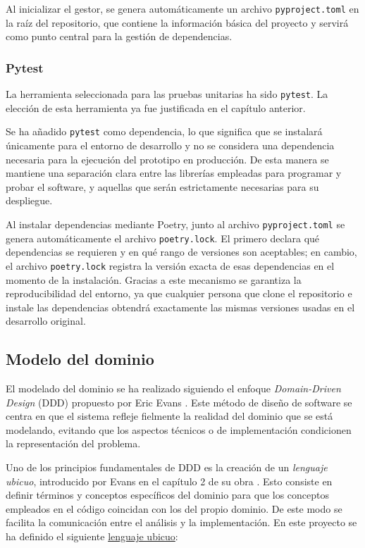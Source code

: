 Al inicializar el gestor, se genera automáticamente un archivo \texttt{pyproject.toml} en la raíz del
repositorio, que contiene la información básica del proyecto y servirá como punto central
para la gestión de dependencias.

\subsubsection{Pytest}
La herramienta seleccionada para las pruebas unitarias ha sido \texttt{pytest}.
La elección de esta herramienta ya fue justificada en el capítulo anterior.

Se ha añadido \texttt{pytest} como dependencia, lo que significa que se instalará únicamente
para el entorno de desarrollo y no se considera una dependencia necesaria para la ejecución del 
prototipo en producción. De esta manera se mantiene una separación clara entre las librerías 
empleadas para programar y probar el software, y aquellas que serán estrictamente necesarias para 
su despliegue.

Al instalar dependencias mediante Poetry, junto al archivo \texttt{pyproject.toml} se genera 
automáticamente el archivo \texttt{poetry.lock}. El primero declara qué dependencias se requieren y 
en qué rango de versiones son aceptables; en cambio, el archivo \texttt{poetry.lock} registra la 
versión exacta de esas dependencias en el momento de la instalación. Gracias a este mecanismo se 
garantiza la reproducibilidad del entorno, ya que cualquier persona que clone el repositorio e 
instale las dependencias obtendrá exactamente las mismas versiones usadas en el desarrollo 
original.

\subsection{Modelo del dominio}
El modelado del dominio se ha realizado siguiendo el enfoque \textit{Domain-Driven Design} (DDD)
propuesto por Eric Evans \cite{evansDDD}. Este método de diseño de software se centra en que
el sistema refleje fielmente la realidad del dominio que se está modelando, evitando que los 
aspectos técnicos o de implementación condicionen la representación del problema.

Uno de los principios fundamentales de DDD es la creación de un \textit{lenguaje ubicuo}, introducido
por Evans en el capítulo 2 de su obra \cite{evansDDD}. Esto consiste en definir términos y conceptos 
específicos del dominio para que los conceptos empleados en el código coincidan con los del propio 
dominio. De este modo se facilita la comunicación entre el análisis y la implementación. En este
proyecto se ha definido el siguiente 
\href{https://agilealliance.org/glossary/ubiquitous-language/?utm_source=chatgpt.com}{lenguaje ubicuo}:

